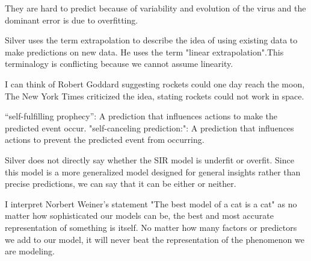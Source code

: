 \documentclass[12pt]{article}
\begin{document}
\begin{enumerate}


They are hard to predict because of variability and evolution of the virus and the dominant error is due to overfitting.


Silver uses the term extrapolation to describe the idea of using existing data to make predictions on new data. He uses the term "linear extrapolation".This terminalogy is conflicting because we cannot assume linearity.


I can think of Robert Goddard suggesting rockets could one day reach the moon, The New York Times criticized the idea, stating rockets could not work in space.


“self-fulfilling prophecy”: A prediction that influences actions to make the predicted event occur.
"self-canceling prediction:": A prediction that influences actions to prevent the predicted event from occurring.


Silver does not directly say whether the SIR model is underfit or overfit. Since this model is a more generalized model designed for general insights rather than precise predictions, we can say that it can be either or neither.


I interpret Norbert Weiner's statement "The best model of a cat is a cat" as no matter how sophisticated our models can be, the best and most accurate representation of something is itself. No matter how many factors or predictors we add to our model, it will never beat the representation of the phenomenon we are modeling.


\end{enumerate}
\end{document}
